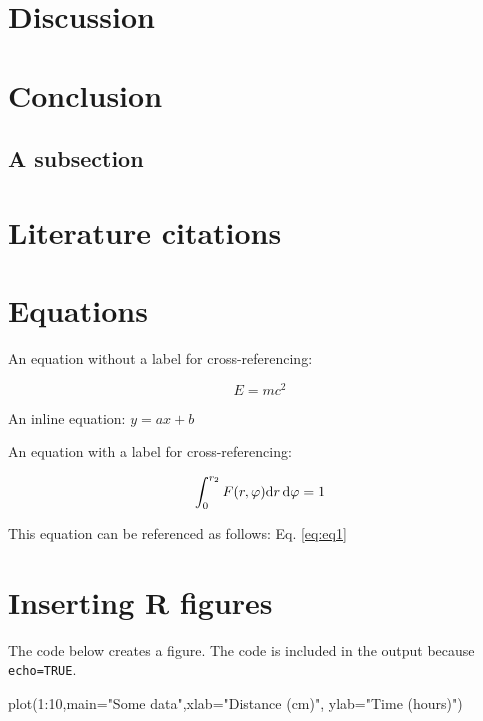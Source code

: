 \documentclass[webpdf,large,contemporary,namedate]{oup-authoring-template}
\newenvironment{Shaded}{\begin{snugshade}}{\end{snugshade}}
\newcommand{\AttributeTok}[1]{\textcolor[rgb]{0.77,0.63,0.00}{#1}}
\newcommand{\DecValTok}[1]{\textcolor[rgb]{0.00,0.00,0.81}{#1}}
\newcommand{\FunctionTok}[1]{\textcolor[rgb]{0.00,0.00,0.00}{#1}}
\newcommand{\NormalTok}[1]{#1}
\newcommand{\SpecialCharTok}[1]{\textcolor[rgb]{0.00,0.00,0.00}{#1}}
\newcommand{\StringTok}[1]{\textcolor[rgb]{0.31,0.60,0.02}{#1}}
\theoremstyle{thmstyleone}
\theoremstyle{thmstyletwo}
\theoremstyle{thmstylethree}
\begin{document}
\hypertarget{discussion}{%
\section{Discussion}\label{discussion}}

\hypertarget{conclusion}{%
\section{Conclusion}\label{conclusion}}

\hypertarget{a-subsection}{%
\subsection{A subsection}\label{a-subsection}}

\hypertarget{literature-citations}{%
\section{Literature citations}\label{literature-citations}}

\hypertarget{equations}{%
\section{Equations}\label{equations}}

An equation without a label for cross-referencing:

\[
E=mc^2
\]

An inline equation: \(y=ax+b\)

An equation with a label for cross-referencing:

\begin{equation}\label{eq:eq1}
\int^{r_2}_0 F(r,\varphi){\rm d}r\,{\rm d}\varphi = 1
\end{equation}

This equation can be referenced as follows: Eq. \ref{eq:eq1}

\hypertarget{inserting-r-figures}{%
\section{Inserting R figures}\label{inserting-r-figures}}

The code below creates a figure. The code is included in the output
because \texttt{echo=TRUE}.

\begin{Shaded}
\begin{Highlighting}[]
\FunctionTok{plot}\NormalTok{(}\DecValTok{1}\SpecialCharTok{:}\DecValTok{10}\NormalTok{,}\AttributeTok{main=}\StringTok{"Some data"}\NormalTok{,}\AttributeTok{xlab=}\StringTok{"Distance (cm)"}\NormalTok{,}
     \AttributeTok{ylab=}\StringTok{"Time (hours)"}\NormalTok{)}
\end{Highlighting}
\end{Shaded}
\end{document}
